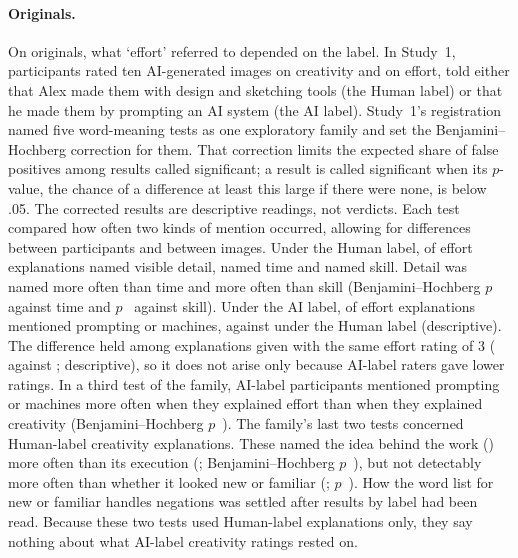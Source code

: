 \paragraph*{Originals.}
On originals, what `effort' referred to depended on the label. In Study~1, \SOneN{} participants rated ten AI-generated images on creativity and on effort, told either that Alex made them with design and sketching tools (the Human label) or that he made them by prompting an AI system (the AI label). Study~1's registration named five word-meaning tests as one exploratory family and set the Benjamini--Hochberg correction for them. That correction limits the expected share of false positives among results called significant;\cite{benjamini1995controlling} a result is called significant when its $p$-value, the chance of a difference at least this large if there were none, is below .05. The corrected results are descriptive readings, not verdicts. Each test compared how often two kinds of mention occurred, allowing for differences between participants and between images. Under the Human label, \SOneTextEffortDetailPct{} of effort explanations named visible detail, \SOneTextEffortTimePct{} named time and \SOneTextEffortSkillPct{} named skill. Detail was named more often than time and more often than skill (Benjamini--Hochberg $p$~\SOneTextDetailVsTimePBH{} against time and $p$~\SOneTextDetailVsSkillPBH{} against skill). Under the AI label, \SOneTextPromptEffortAIPct{} of effort explanations mentioned prompting or machines, against \SOneTextPromptEffortHumanPct{} under the Human label (descriptive). The difference held among explanations given with the same effort rating of 3 (\SOneTextPromptEffortRatingThreeAIPct{} against \SOneTextPromptEffortRatingThreeHumanPct; descriptive), so it does not arise only because AI-label raters gave lower ratings. In a third test of the family, AI-label participants mentioned prompting or machines more often when they explained effort than when they explained creativity (Benjamini--Hochberg $p$~\SOneTextPromptEffortVsCreatPBH). The family's last two tests concerned Human-label creativity explanations. These named the idea behind the work (\SOneTextCreatConceptPct) more often than its execution (\SOneTextCreatExecutionPct; Benjamini--Hochberg $p$~\SOneTextConceptVsExecutionPBH), but not detectably more often than whether it looked new or familiar (\SOneTextCreatNoveltyPct; $p$~\SOneTextConceptVsNoveltyPBH). How the word list for new or familiar handles negations was settled after results by label had been read. Because these two tests used Human-label explanations only, they say nothing about what AI-label creativity ratings rested on.

